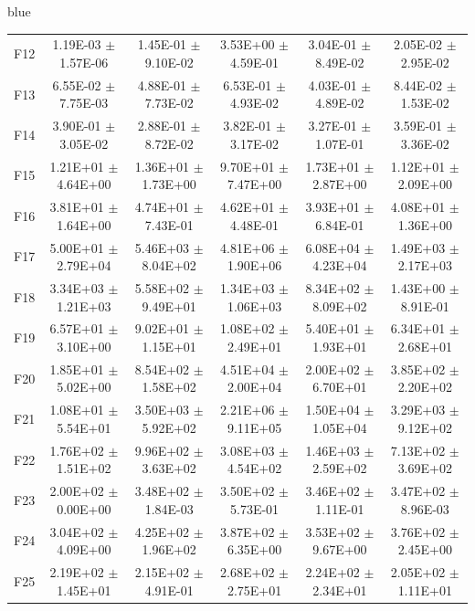 \documentclass[journal, onecolumn]{IEEEtran}
\begin{document}
\begin{color}{blue}
\begin{table}[htbp!]
\begin{tabular}{c|ccccc}
			F12	 &	1.19E-03	$\pm$	1.57E-06	 &	1.45E-01	$\pm$	9.10E-02		 &	3.53E+00	$\pm$	4.59E-01		 &	3.04E-01	$\pm$	8.49E-02		 &	2.05E-02	$\pm$	2.95E-02	\\		
			F13	 &	6.55E-02	$\pm$	7.75E-03	 &	4.88E-01	$\pm$	7.73E-02		 &	6.53E-01	$\pm$	4.93E-02		 &	4.03E-01	$\pm$	4.89E-02		 &	8.44E-02	$\pm$	1.53E-02	\\		
			F14	 &	3.90E-01	$\pm$	3.05E-02	 &	2.88E-01	$\pm$	8.72E-02		 &	3.82E-01	$\pm$	3.17E-02		 &	3.27E-01	$\pm$	1.07E-01		 &	3.59E-01	$\pm$	3.36E-02	\\		
			F15	 &	1.21E+01	$\pm$	4.64E+00	 &	1.36E+01	$\pm$	1.73E+00		 &	9.70E+01	$\pm$	7.47E+00		 &	1.73E+01	$\pm$	2.87E+00		 &	1.12E+01	$\pm$	2.09E+00	\\		
			F16	 &	3.81E+01	$\pm$	1.64E+00	 &	4.74E+01	$\pm$	7.43E-01		 &	4.62E+01	$\pm$	4.48E-01		 &	3.93E+01	$\pm$	6.84E-01		 &	4.08E+01	$\pm$	1.36E+00	\\		
			F17	 &	5.00E+01	$\pm$	2.79E+04	 &	5.46E+03	$\pm$	8.04E+02		 &	4.81E+06	$\pm$	1.90E+06		 &	6.08E+04	$\pm$	4.23E+04		 &	1.49E+03	$\pm$	2.17E+03	\\		
			F18	 &	3.34E+03	$\pm$	1.21E+03	 &	5.58E+02	$\pm$	9.49E+01		 &	1.34E+03	$\pm$	1.06E+03		 &	8.34E+02	$\pm$	8.09E+02		 &	1.43E+00	$\pm$	8.91E-01	\\		
			F19	 &	6.57E+01	$\pm$	3.10E+00	 &	9.02E+01	$\pm$	1.15E+01		 &	1.08E+02	$\pm$	2.49E+01		 &	5.40E+01	$\pm$	1.93E+01		 &	6.34E+01	$\pm$	2.68E+01	\\		
			F20	 &	1.85E+01	$\pm$	5.02E+00	 &	8.54E+02	$\pm$	1.58E+02		 &	4.51E+04	$\pm$	2.00E+04		 &	2.00E+02	$\pm$	6.70E+01		 &	3.85E+02	$\pm$	2.20E+02	\\		
			F21	 &	1.08E+01	$\pm$	5.54E+01	 &	3.50E+03	$\pm$	5.92E+02		 &	2.21E+06	$\pm$	9.11E+05		 &	1.50E+04	$\pm$	1.05E+04		 &	3.29E+03	$\pm$	9.12E+02	\\		
			F22	 &	1.76E+02	$\pm$	1.51E+02	 &	9.96E+02	$\pm$	3.63E+02		 &	3.08E+03	$\pm$	4.54E+02		 &	1.46E+03	$\pm$	2.59E+02		 &	7.13E+02	$\pm$	3.69E+02	\\		
			F23	 &	2.00E+02	$\pm$	0.00E+00	 &	3.48E+02	$\pm$	1.84E-03		 &	3.50E+02	$\pm$	5.73E-01		 &	3.46E+02	$\pm$	1.11E-01		 &	3.47E+02	$\pm$	8.96E-03	\\		
			F24	 &	3.04E+02	$\pm$	4.09E+00	 &	4.25E+02	$\pm$	1.96E+02		 &	3.87E+02	$\pm$	6.35E+00		 &	3.53E+02	$\pm$	9.67E+00		 &	3.76E+02	$\pm$	2.45E+00	\\		
			F25	 &	2.19E+02	$\pm$	1.45E+01	 &	2.15E+02	$\pm$	4.91E-01		 &	2.68E+02	$\pm$	2.75E+01		 &	2.24E+02	$\pm$	2.34E+01		 &	2.05E+02	$\pm$	1.11E+01	\\		

\end{tabular}
\end{table}
\end{color}
\end{document}
